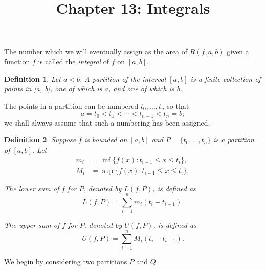 \documentclass{article}
\newtheorem{definition}{Definition}
\begin{document}
\title{Chapter 13: Integrals}
\maketitle

The number which we will eventually assign as the area of $R(f, a, b)$ given a
function $f$ is called the \emph{integral} of $f$ on $[a, b]$.

\begin{definition}
  Let $a < b$. A \emph{partition} of the interval $[a, b]$ is a finite
  collection of points in [a, b], one of which is $a$, and one of which is $b$.
\end{definition}

The points in a partition can be numbered $t_0, \ldots, t_n$ so that \[
  a = t_0 < t_1 < \cdots < t_{n - 1} < t_n = b;
\] we shall always assume that such a numbering has been assigned.

\begin{definition}
  Suppose $f$ is bounded on $[a, b]$ and $P = \{t_0, \ldots, t_n\}$ is a
  partition of $[a, b]$. Let
  \begin{align*}
    m_i &= \inf\{f(x): t_{i - 1} \leq x \leq t_i\}, \\
    M_i &= \sup\{f(x): t_{i - 1} \leq x \leq t_i\},
  \end{align*}

  The \emph{lower sum} of $f$ for $P$, denoted by $L(f, P)$, is defined as \[
    L(f, P) = \sum_{i = 1}^n m_i(t_i - t_{i - 1}).
  \]

  The \emph{upper sum} of $f$ for $P$, denoted by $U(f, P)$, is defined as \[
    U(f, P) = \sum_{i = 1}^n M_i(t_i - t_{i - 1}).
  \]
\end{definition}

We begin by considering two partitions $P$ and $Q$.
\end{document}
